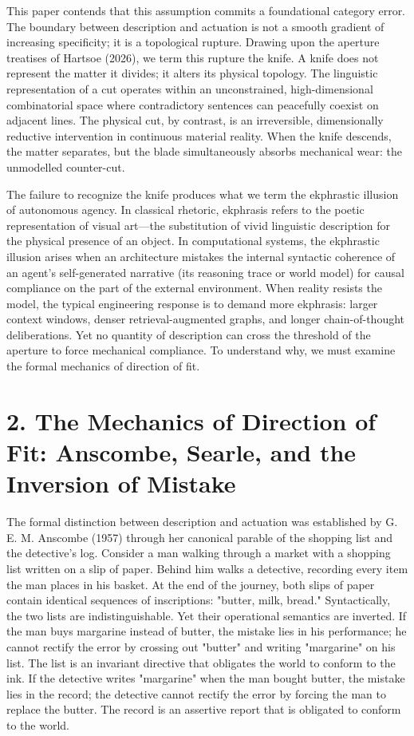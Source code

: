 \documentclass[11pt,twocolumn]{article}
\begin{document}
This paper contends that this assumption commits a foundational category error. The boundary between description and actuation is not a smooth gradient of increasing specificity; it is a topological rupture. Drawing upon the aperture treatises of Hartsoe (2026), we term this rupture the knife. A knife does not represent the matter it divides; it alters its physical topology. The linguistic representation of a cut operates within an unconstrained, high-dimensional combinatorial space where contradictory sentences can peacefully coexist on adjacent lines. The physical cut, by contrast, is an irreversible, dimensionally reductive intervention in continuous material reality. When the knife descends, the matter separates, but the blade simultaneously absorbs mechanical wear: the unmodelled counter-cut.

The failure to recognize the knife produces what we term the ekphrastic illusion of autonomous agency. In classical rhetoric, ekphrasis refers to the poetic representation of visual art—the substitution of vivid linguistic description for the physical presence of an object. In computational systems, the ekphrastic illusion arises when an architecture mistakes the internal syntactic coherence of an agent's self-generated narrative (its reasoning trace or world model) for causal compliance on the part of the external environment. When reality resists the model, the typical engineering response is to demand more ekphrasis: larger context windows, denser retrieval-augmented graphs, and longer chain-of-thought deliberations. Yet no quantity of description can cross the threshold of the aperture to force mechanical compliance. To understand why, we must examine the formal mechanics of direction of fit.

\section*{2. The Mechanics of Direction of Fit: Anscombe, Searle, and the Inversion of Mistake}
The formal distinction between description and actuation was established by G. E. M. Anscombe (1957) through her canonical parable of the shopping list and the detective's log. Consider a man walking through a market with a shopping list written on a slip of paper. Behind him walks a detective, recording every item the man places in his basket. At the end of the journey, both slips of paper contain identical sequences of inscriptions: "butter, milk, bread." Syntactically, the two lists are indistinguishable. Yet their operational semantics are inverted. If the man buys margarine instead of butter, the mistake lies in his performance; he cannot rectify the error by crossing out "butter" and writing "margarine" on his list. The list is an invariant directive that obligates the world to conform to the ink. If the detective writes "margarine" when the man bought butter, the mistake lies in the record; the detective cannot rectify the error by forcing the man to replace the butter. The record is an assertive report that is obligated to conform to the world.
\end{document}
